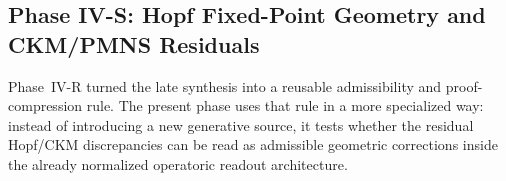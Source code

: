 

\subsection*{Phase IV-S: Hopf Fixed-Point Geometry and CKM/PMNS Residuals}
\label{sec:hopf_ckm}

\begin{remark}\label{rem:transition_r_to_s}
Phase~IV-R turned the late synthesis into a reusable admissibility and proof-compression rule. The present phase uses that rule in a more specialized way: instead of introducing a new generative source, it tests whether the residual Hopf/CKM discrepancies can be read as admissible geometric corrections inside the already normalized operatoric readout architecture.
\end{remark}


